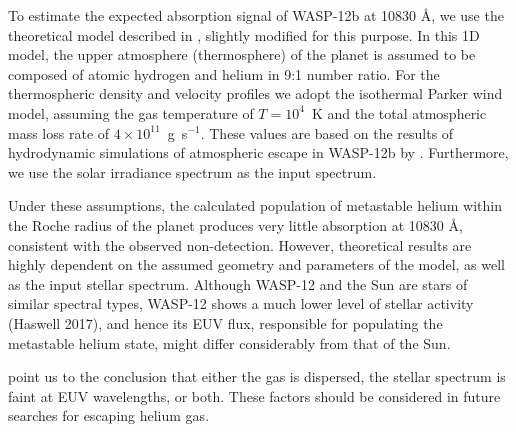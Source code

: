 \documentclass[RNAAS]{aastex62}
\begin{document}
To estimate the expected absorption signal of WASP-12b at 10830 \AA, we use the theoretical model described in \cite{oklopcic18}, slightly modified for this purpose. In this 1D model, the upper atmosphere (thermosphere) of the planet is assumed to be composed of atomic hydrogen and helium in 9:1 number ratio. For the thermospheric density and velocity profiles we adopt the isothermal Parker wind model, assuming the gas temperature of $T=10^4$~K and the total atmospheric mass loss rate of $4\times 10^{11}$~g~s$^{-1}$. These values are based on the results of hydrodynamic simulations of atmospheric escape in WASP-12b by \cite{salz16}. Furthermore, we use the solar irradiance spectrum as the input spectrum. 

Under these assumptions, the calculated population of metastable helium within the Roche radius of the planet produces very little absorption at 10830 \AA, consistent with the observed non-detection. However, theoretical results are highly dependent on the assumed geometry and parameters of the model, as well as the input stellar spectrum. Although WASP-12 and the Sun are stars of similar spectral types, WASP-12 shows a much lower level of stellar activity (Haswell 2017), and hence its EUV flux, responsible for populating the metastable helium state, might differ considerably from that of the Sun. 

point us to the conclusion that either the gas is dispersed, the stellar spectrum is faint at EUV wavelengths, or both. These factors should be considered in future searches for escaping helium gas.




\end{document}
